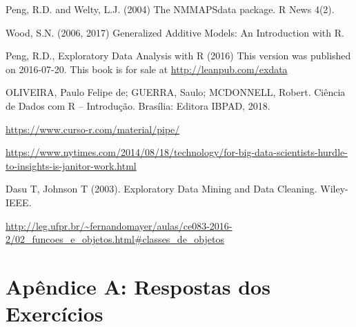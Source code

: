 \documentclass[]{book}
\begin{document}
Peng, R.D. and Welty, L.J. (2004) The NMMAPSdata package. R News 4(2).

Wood, S.N. (2006, 2017) Generalized Additive Models: An Introduction with R.

Peng, R.D., Exploratory Data Analysis with R (2016) This version was published on 2016-07-20. This book is for sale at \url{http://leanpub.com/exdata}

OLIVEIRA, Paulo Felipe de; GUERRA, Saulo; MCDONNELL, Robert. Ciência de Dados com R -- Introdução. Brasília: Editora IBPAD, 2018.

\url{https://www.curso-r.com/material/pipe/}

\url{https://www.nytimes.com/2014/08/18/technology/for-big-data-scientists-hurdle-to-insights-is-janitor-work.html}

Dasu T, Johnson T (2003). Exploratory Data Mining and Data Cleaning. Wiley-IEEE.

\url{http://leg.ufpr.br/~fernandomayer/aulas/ce083-2016-2/02_funcoes_e_objetos.html\#classes_de_objetos}

\hypertarget{apuxeandice-a-respostas-dos-exercuxedcios}{%
\chapter*{Apêndice A: Respostas dos Exercícios}\label{apuxeandice-a-respostas-dos-exercuxedcios}}


\end{document}
